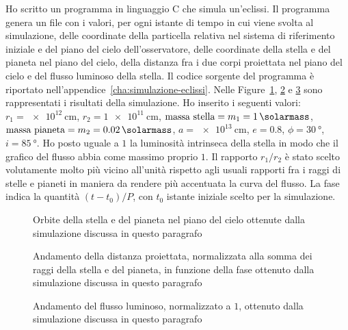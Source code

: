 Ho scritto un programma in linguaggio C che simula un'eclissi. Il programma
genera un file con i valori, per ogni istante di tempo in cui viene svolta al
simulazione, delle coordinate della particella relativa nel sistema di
riferimento iniziale e del piano del cielo dell'osservatore, delle coordinate
della stella e del pianeta nel piano del cielo, della distanza fra i due corpi
proiettata nel piano del cielo e del flusso luminoso della stella. Il codice
sorgente del programma è riportato
nell'appendice~\ref{cha:simulazione-eclissi}. Nelle
Figure~\ref{fig:sim-ecl-piano-cielo}, \ref{fig:sim-ecl-distanza-proiettata} e
\ref{fig:sim-ecl-flusso} sono rappresentati i risultati della simulazione. Ho
inserito i seguenti valori: $r_1 = \SI{e12}{\centi\metre}$,
$r_2 = \SI{1e11}{\centi\metre}$, $\text{massa stella} = m_1 =
\SI{1}{\solarmass}$, $\text{massa pianeta} = m_2 = \SI{0.02}{\solarmass}$,
$a = \SI{e13}{\centi\metre}$, $e = 0.8$, $\phi = \SI{30}{\degree}$,
$i = \SI{85}{\degree}$. Ho posto uguale a $1$ la luminosità intrinseca della
stella in modo che il grafico del flusso abbia come massimo proprio $1$. Il
rapporto $r_1 / r_2$ è stato scelto volutamente molto più vicino all'unità
rispetto agli usuali rapporti fra i raggi di stelle e pianeti in maniera da
rendere più accentuata la curva del flusso. La fase indica la quantità $(t -
t_0)/P$, con $t_0$ istante iniziale scelto per la simulazione.

\begin{figure}
  \centering
  
  \caption[Orbite della stella e del pianeta nel piano del cielo]{Orbite della
    stella e del pianeta nel piano del cielo ottenute dalla simulazione discussa
    in questo paragrafo}
  \label{fig:sim-ecl-piano-cielo}
\end{figure}
\begin{figure}
  
  \caption[Distanza proiettata in funzione della fase]{Andamento della distanza
    proiettata, normalizzata alla somma dei raggi della stella e del pianeta, in
    funzione della fase ottenuto dalla simulazione discussa in questo paragrafo}
  \label{fig:sim-ecl-distanza-proiettata}
\end{figure}
\begin{figure}
  
  \caption[Flusso luminoso, normalizzato a $1$, di un sistema binario a
  eclissi]{Andamento del flusso luminoso, normalizzato a $1$, ottenuto dalla
    simulazione discussa in questo paragrafo}
  \label{fig:sim-ecl-flusso}
\end{figure}

